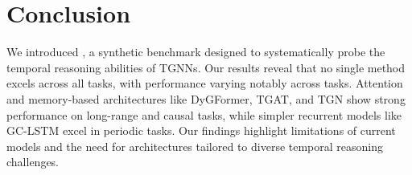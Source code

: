 \section{Conclusion}

We introduced \benchmarkname, a synthetic benchmark designed to systematically probe the temporal reasoning abilities of TGNNs. Our results reveal that no single method excels across all tasks, with performance varying notably across tasks. Attention and memory-based architectures like DyGFormer, TGAT, and TGN show strong performance on long-range and causal tasks, while simpler recurrent models like GC-LSTM excel in periodic tasks. Our findings highlight limitations of current models and the need for architectures tailored to diverse temporal reasoning challenges.

